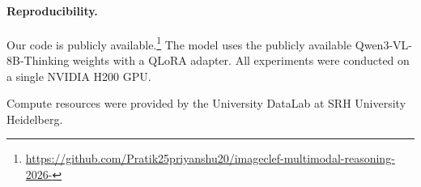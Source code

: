 \documentclass[]{ceurart}
\begin{document}
\paragraph{Reproducibility.}
Our code is publicly available.\footnote{\url{https://github.com/Pratik25priyanshu20/imageclef-multimodal-reasoning-2026-}}
The model uses the publicly available Qwen3-VL-8B-Thinking weights with a QLoRA adapter.
All experiments were conducted on a single NVIDIA H200 GPU.

\begin{acknowledgments}
Compute resources were provided by the University DataLab at SRH University Heidelberg.
\end{acknowledgments}


\end{document}
